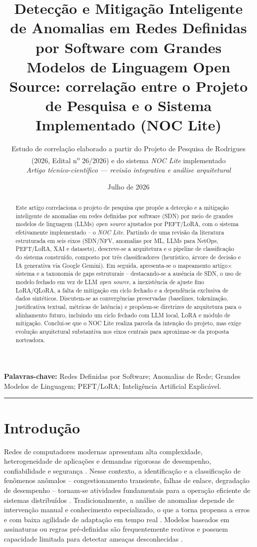 \documentclass[12pt,a4paper]{article}
\title{\textbf{Detecção e Mitigação Inteligente de Anomalias em Redes
Definidas por Software com Grandes Modelos de Linguagem Open Source:
correlação entre o Projeto de Pesquisa e o Sistema Implementado (NOC Lite)}}
\author{Estudo de correlação elaborado a partir do Projeto de Pesquisa
de \mbox{Rodrigues} (2026, Edital n\textsuperscript{o} 26/2026) e do
sistema \textit{NOC Lite} implementado \\[2mm]
\textit{Artigo técnico-científico — revisão integrativa e análise arquitetural}}
\date{Julho de 2026}
\begin{document}
\maketitle

\begin{abstract}
Este artigo correlaciona o projeto de pesquisa que propõe a detecção e a
mitigação inteligente de anomalias em redes definidas por software (SDN) por
meio de grandes modelos de linguagem (LLMs) \textit{open source} ajustados por
PEFT/LoRA, com o sistema efetivamente implementado -- o \textit{NOC Lite}.
Partindo de uma revisão da literatura estruturada em seis eixos (SDN/NFV,
anomalias por ML, LLMs para NetOps, PEFT/LoRA, XAI e datasets), descreve-se a
arquitetura e o pipeline de classificação do sistema construído, composto por
três classificadores (heurístico, árvore de decisão e IA generativa via Google
Gemini). Em seguida, apresenta-se o mapeamento artigo$\times$sistema e a
taxonomia de gaps estruturais -- destacando-se a ausência de SDN, o uso de
modelo fechado em vez de LLM \textit{open source}, a inexistência de
ajuste fino LoRA/QLoRA, a falta de mitigação em ciclo fechado e a dependência
exclusiva de dados sintéticos. Discutem-se as convergências preservadas
(baselines, tokenização, justificativa textual, métricas de latência) e
propõem-se diretrizes de arquitetura para o alinhamento futuro, incluindo um
ciclo fechado com LLM local, LoRA e módulo de mitigação. Conclui-se que o NOC
Lite realiza parcela da intenção do projeto, mas exige evolução arquitetural
substantiva nos eixos centrais para aproximar-se da proposta norteadora.
\end{abstract}

\noindent\textbf{Palavras-chave:} Redes Definidas por Software; Anomalias de Rede;
Grandes Modelos de Linguagem; PEFT/LoRA; Inteligência Artificial Explicável.

\vspace{6pt}
\hrule
\vspace{10pt}

\section{Introdução}
\label{sec:intro}

Redes de computadores modernas apresentam alta complexidade, heterogeneidade de
aplicações e demandas rigorosas de desempenho, confiabilidade e segurança
\cite{rRODRIGUES}. Nesse contexto, a identificação e a classificação de fenômenos
anômalos -- congestionamento transiente, falhas de enlace, degradação de
desempenho -- tornam-se atividades fundamentais para a operação eficiente de
sistemas distribuídos \cite{rA39}. Tradicionalmente, a análise de anomalias depende
de intervenção manual e conhecimento especializado, o que a torna propensa a
erros e com baixa agilidade de adaptação em tempo real \cite{rA39}. Modelos baseados
em assinaturas ou regras pré-definidas são frequentemente reativos e possuem
capacidade limitada para detectar ameaças desconhecidas \cite{rA512}.
\end{document}
